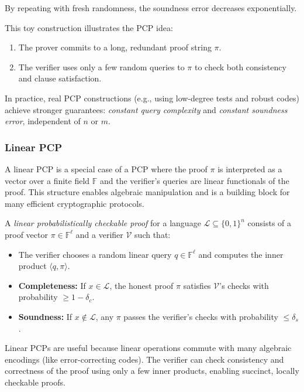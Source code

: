 By repeating with fresh randomness, the soundness error decreases exponentially.

\myspace

\begin{remark}
This toy construction illustrates the PCP idea:  
\begin{enumerate}
  \item The prover commits to a long, redundant proof string $\pi$.  
  \item The verifier uses only a few random queries to $\pi$ to check both consistency and clause satisfaction.  
\end{enumerate}
In practice, real PCP constructions (e.g., using low-degree tests and robust codes) achieve stronger guarantees: \emph{constant query complexity} and \emph{constant soundness error}, independent of $n$ or $m$.
\end{remark}

\subsubsection*{Linear PCP}

\noindent A linear PCP is a special case of a PCP where the proof $\pi$ is interpreted as a vector over a finite field $\mathbb{F}$ and the verifier’s queries are linear functionals of the proof. This structure enables algebraic manipulation and is a building block for many efficient cryptographic protocols.

\begin{definition}
A \emph{linear probabilistically checkable proof} for a language $\mathcal{L} \subseteq \{0,1\}^n$ consists of a proof vector $\pi \in \mathbb{F}^\ell$ and a verifier $\mathcal{V}$ such that:
\begin{itemize}
    \item The verifier chooses a random linear query $q \in \mathbb{F}^\ell$ and computes the inner product $\langle q, \pi \rangle$.
    \item \textbf{Completeness:} If $x \in \mathcal{L}$, the honest proof $\pi$ satisfies $\mathcal{V}$’s checks with probability $\ge 1-\delta_c$.
    \item \textbf{Soundness:} If $x \notin \mathcal{L}$, any $\pi$ passes the verifier’s checks with probability $\le \delta_s$.
\end{itemize}
\end{definition}

\begin{remark}[Intuition]
Linear PCPs are useful because linear operations commute with many algebraic encodings (like error-correcting codes).  
The verifier can check consistency and correctness of the proof using only a few inner products, enabling succinct, locally checkable proofs.
\end{remark}


